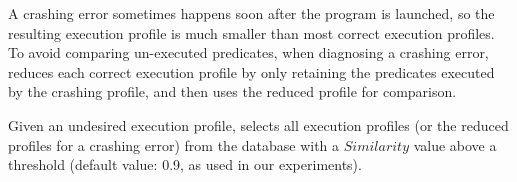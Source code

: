 







A crashing error sometimes happens soon after the program is launched,
so the resulting execution profile is much smaller than
most correct execution profiles.
To avoid comparing un-executed predicates,
when diagnosing a crashing error, \ourtool
reduces each correct execution profile by only retaining
the predicates executed by the crashing profile, and then
uses the reduced profile for comparison. 


Given an undesired execution profile,
\ourtool selects all execution profiles (or the reduced profiles for
a crashing error) from the database
with a $Similarity$ value above a threshold (default value: 0.9, as used in our
experiments).


